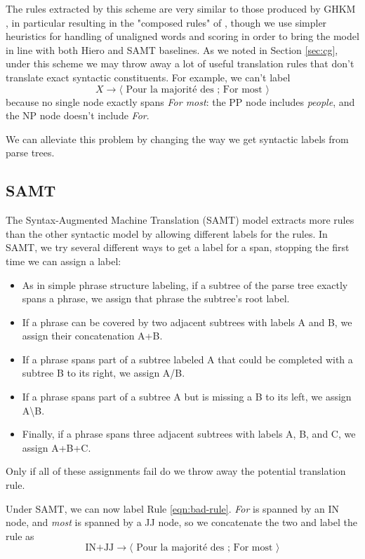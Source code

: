 \documentclass[a4paper]{article}
\begin{document}
The rules extracted by this scheme are very similar to those produced by GHKM \cite{ghkm}, in particular resulting in the "composed rules" of , though we use simpler heuristics for handling of unaligned words and scoring in order to bring the model in line with both Hiero and SAMT baselines.
As we noted in Section \ref{sec:cg}, under this scheme we may throw away a lot of useful translation rules that don't translate exact syntactic constituents. For example, we can't label
\begin{equation}
\label{eqn:bad-rule}
X \to \langle \textrm{ Pour la majorit\'{e} des ; For most } \rangle
\end{equation}
because no single node exactly spans {\em For most}: the PP node includes {\em people}, and the NP node doesn't include {\em For}.

We can alleviate this problem by changing the way we get syntactic labels from parse trees.

\subsection{SAMT}

The Syntax-Augmented Machine Translation (SAMT) model \cite{samt-wmt06} extracts more rules than the other syntactic model by allowing different labels for the rules. In SAMT, we try several different ways to get a label for a span, stopping the first time we can assign a label:
\begin{itemize}
\item As in simple phrase structure labeling, if a subtree of the parse tree exactly spans a phrase, we assign that phrase the subtree's root label.
\item If a phrase can be covered by two adjacent subtrees with labels A and B, we assign their concatenation A+B.
\item If a phrase spans part of a subtree labeled A that could be completed with a subtree B to its right, we assign A/B.
\item If a phrase spans part of a subtree A but is missing a B to its left, we assign A\textbackslash B.
\item Finally, if a phrase spans three adjacent subtrees with labels A, B, and C, we assign A+B+C.
\end{itemize}
Only if all of these assignments fail do we throw away the potential translation rule.

Under SAMT, we can now label Rule \ref{eqn:bad-rule}. {\em For} is spanned by an IN node, and {\em most} is spanned by a JJ node, so we concatenate the two and label the rule as
\begin{equation*}
\textrm{IN+JJ} \to \langle \textrm{ Pour la majorit\'{e} des ; For most } \rangle
\end{equation*}
\end{document}
